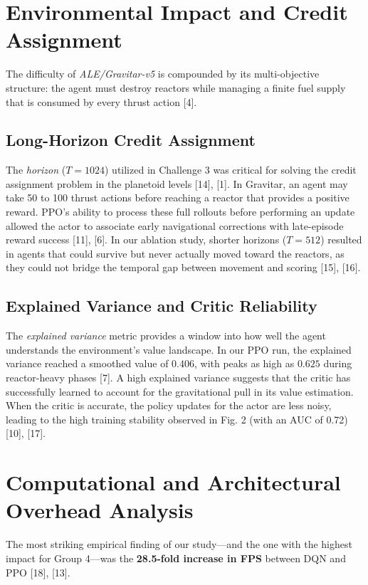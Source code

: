 \documentclass[conference]{IEEEtran}
\begin{document}
\section{Environmental Impact and Credit Assignment}
The difficulty of \textit{ALE/Gravitar-v5} is compounded by its multi-objective structure: the agent must destroy reactors while managing a finite fuel supply that is consumed by every thrust action [4].

\subsection{Long-Horizon Credit Assignment}
The \textit{horizon} ($T=1024$) utilized in Challenge 3 was critical for solving the credit assignment problem in the planetoid levels [14], [1].
In Gravitar, an agent may take 50 to 100 thrust actions before reaching a reactor that provides a positive reward.
PPO’s ability to process these full rollouts before performing an update allowed the actor to associate early navigational corrections with late-episode reward success [11], [6].
In our ablation study, shorter horizons ($T=512$) resulted in agents that could survive but never actually moved toward the reactors, as they could not bridge the temporal gap between movement and scoring [15], [16].

\subsection{Explained Variance and Critic Reliability}
The \textit{explained variance} metric provides a window into how well the agent understands the environment's value landscape.
In our PPO run, the explained variance reached a smoothed value of \textbf{$0.406$}, with peaks as high as \textbf{$0.625$} during reactor-heavy phases [7].
A high explained variance suggests that the critic has successfully learned to account for the gravitational pull in its value estimation.
When the critic is accurate, the policy updates for the actor are less noisy, leading to the high training stability observed in Fig. 2 (with an AUC of 0.72) [10], [17].

\section{Computational and Architectural Overhead Analysis}
The most striking empirical finding of our study—and the one with the highest impact for Group 4—was the \textbf{28.5-fold increase in FPS} between DQN and PPO [18], [13].
\end{document}
